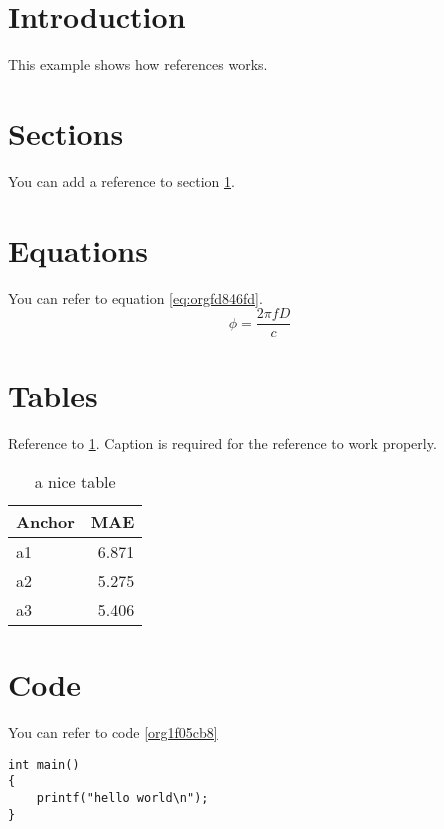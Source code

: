 


\section{Introduction}
\label{sec:org03c322b}
This example shows how references works.

\section{Sections}
\label{sec:org76e01fb}
You can add a reference to section \ref{sec:org03c322b}.

\section{Equations}
\label{sec:org7e8410f}
You can refer to equation \ref{eq:orgfd846fd}.
\begin{equation}
\label{eq:orgfd846fd}
\phi = \frac{2\pi fD}{c}
\end{equation}

\section{Tables}
\label{sec:org9c1795d}
Reference to \ref{tab:orgce22f4b}.
Caption is required for the reference to work properly.

\begin{table}[htbp]
\caption{\label{tab:orgce22f4b}
a nice table}
\centering
\begin{tabular}{lr}
Anchor & MAE\\
\hline
a1 & 6.871\\
a2 & 5.275\\
a3 & 5.406\\
\end{tabular}
\end{table}

\section{Code}
\label{sec:orgcf908e7}
You can refer to code \ref{org1f05cb8}

\begin{verbatim}
int main()
{
    printf("hello world\n");
}
\end{verbatim}


